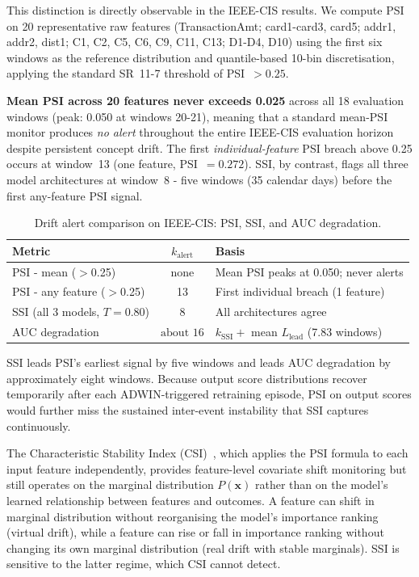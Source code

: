 \documentclass[pdflatex,sn-mathphys-num]{sn-jnl}
\theoremstyle{thmstyleone}
\theoremstyle{thmstyletwo}
\theoremstyle{thmstylethree}
\begin{document}
This distinction is directly observable in the IEEE-CIS results. We compute
PSI on 20 representative raw features (TransactionAmt; card1-card3, card5;
addr1, addr2, dist1; C1, C2, C5, C6, C9, C11, C13; D1-D4, D10) using the
first six windows as the reference distribution and quantile-based 10-bin
discretisation, applying the standard SR~11-7 threshold of PSI~$> 0.25$.

\textbf{Mean PSI across 20 features never exceeds 0.025} across all 18
evaluation windows (peak: 0.050 at windows 20-21), meaning that a standard
mean-PSI monitor produces \emph{no alert} throughout the entire IEEE-CIS
evaluation horizon despite persistent concept drift. The first
\emph{individual-feature} PSI breach above 0.25 occurs at window~13
(one feature, PSI~$= 0.272$). SSI, by contrast, flags all three model
architectures at window~8 - five windows (35 calendar days) before the
first any-feature PSI signal.

\begin{table}[t]
  \caption{Drift alert comparison on IEEE-CIS: PSI, SSI, and AUC degradation.}
  \label{tab:psi_comparison}
  \centering\footnotesize
  \begin{tabular}{lcl}
    \toprule
    Metric & $k_{\mathrm{alert}}$ & Basis \\
    \midrule
    PSI - mean ($>$0.25) & none & Mean PSI peaks at 0.050; never alerts \\
    PSI - any feature ($>$0.25) & 13 & First individual breach (1 feature) \\
    SSI (all 3 models, $T=0.80$) & 8 & All architectures agree \\
    AUC degradation & ${\text{about }}16$ & $k_{\mathrm{SSI}} +$ mean $L_{\mathrm{lead}}$ (7.83 windows) \\
    \bottomrule
  \end{tabular}
\end{table}

SSI leads PSI's earliest signal by five windows and leads AUC degradation
by approximately eight windows. Because output score distributions recover
temporarily after each ADWIN-triggered retraining episode, PSI on output
scores would further miss the sustained inter-event instability that SSI
captures continuously.

The Characteristic Stability Index (CSI)~\cite{siddiqi2006scorecard}, which
applies the PSI formula to each input feature independently, provides
feature-level covariate shift monitoring but still operates on the marginal
distribution $P(\mathbf{x})$ rather than on the model's learned relationship
between features and outcomes. A feature can shift in marginal distribution
without reorganising the model's importance ranking (virtual drift), while a
feature can rise or fall in importance ranking without changing its own
marginal distribution (real drift with stable marginals). SSI is sensitive to
the latter regime, which CSI cannot detect.
\end{document}
